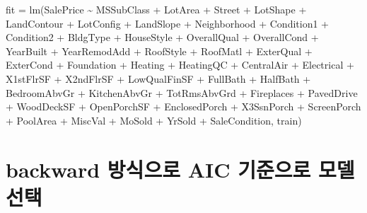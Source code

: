 \documentclass[
]{article}
\newenvironment{Shaded}{\begin{snugshade}}{\end{snugshade}}
\newcommand{\FunctionTok}[1]{\textcolor[rgb]{0.00,0.00,0.00}{#1}}
\newcommand{\NormalTok}[1]{#1}
\newcommand{\OtherTok}[1]{\textcolor[rgb]{0.56,0.35,0.01}{#1}}
\newcommand{\SpecialCharTok}[1]{\textcolor[rgb]{0.00,0.00,0.00}{#1}}
\begin{document}
\begin{Shaded}
\begin{Highlighting}[]
\NormalTok{fit }\OtherTok{=} \FunctionTok{lm}\NormalTok{(SalePrice }\SpecialCharTok{\textasciitilde{}}\NormalTok{ MSSubClass }\SpecialCharTok{+}\NormalTok{ LotArea }\SpecialCharTok{+}\NormalTok{ Street }\SpecialCharTok{+}\NormalTok{ LotShape }\SpecialCharTok{+}\NormalTok{ LandContour }\SpecialCharTok{+}\NormalTok{ LotConfig }\SpecialCharTok{+}    
\NormalTok{              LandSlope }\SpecialCharTok{+}\NormalTok{ Neighborhood }\SpecialCharTok{+}\NormalTok{ Condition1 }\SpecialCharTok{+}\NormalTok{ Condition2 }\SpecialCharTok{+}\NormalTok{ BldgType }\SpecialCharTok{+}\NormalTok{ HouseStyle }\SpecialCharTok{+}\NormalTok{ OverallQual }\SpecialCharTok{+}  
\NormalTok{              OverallCond }\SpecialCharTok{+}\NormalTok{ YearBuilt }\SpecialCharTok{+}\NormalTok{ YearRemodAdd }\SpecialCharTok{+}\NormalTok{  RoofStyle }\SpecialCharTok{+}\NormalTok{ RoofMatl }\SpecialCharTok{+}\NormalTok{ ExterQual }\SpecialCharTok{+}\NormalTok{ ExterCond }\SpecialCharTok{+}    
\NormalTok{              Foundation }\SpecialCharTok{+}\NormalTok{ Heating }\SpecialCharTok{+}\NormalTok{ HeatingQC }\SpecialCharTok{+}\NormalTok{ CentralAir }\SpecialCharTok{+}\NormalTok{ Electrical }\SpecialCharTok{+}\NormalTok{ X1stFlrSF }\SpecialCharTok{+}\NormalTok{ X2ndFlrSF }\SpecialCharTok{+}    
\NormalTok{              LowQualFinSF }\SpecialCharTok{+}\NormalTok{ FullBath }\SpecialCharTok{+}\NormalTok{ HalfBath }\SpecialCharTok{+}\NormalTok{ BedroomAbvGr }\SpecialCharTok{+}\NormalTok{  KitchenAbvGr }\SpecialCharTok{+}\NormalTok{ TotRmsAbvGrd }\SpecialCharTok{+} 
\NormalTok{              Fireplaces }\SpecialCharTok{+}\NormalTok{ PavedDrive  }\SpecialCharTok{+}\NormalTok{ WoodDeckSF }\SpecialCharTok{+}\NormalTok{ OpenPorchSF }\SpecialCharTok{+}\NormalTok{ EnclosedPorch }\SpecialCharTok{+}\NormalTok{ X3SsnPorch }\SpecialCharTok{+}\NormalTok{ ScreenPorch }\SpecialCharTok{+}  
\NormalTok{              PoolArea }\SpecialCharTok{+}\NormalTok{ MiscVal }\SpecialCharTok{+}\NormalTok{ MoSold }\SpecialCharTok{+}\NormalTok{ YrSold }\SpecialCharTok{+}\NormalTok{ SaleCondition, train)}
\end{Highlighting}
\end{Shaded}

\hypertarget{backward-uxbc29uxc2dduxc73cuxb85c-aic-uxae30uxc900uxc73cuxb85c-uxbaa8uxb378-uxc120uxd0dd}{%
\section{backward 방식으로 AIC 기준으로 모델
선택}\label{backward-uxbc29uxc2dduxc73cuxb85c-aic-uxae30uxc900uxc73cuxb85c-uxbaa8uxb378-uxc120uxd0dd}}
\end{document}
